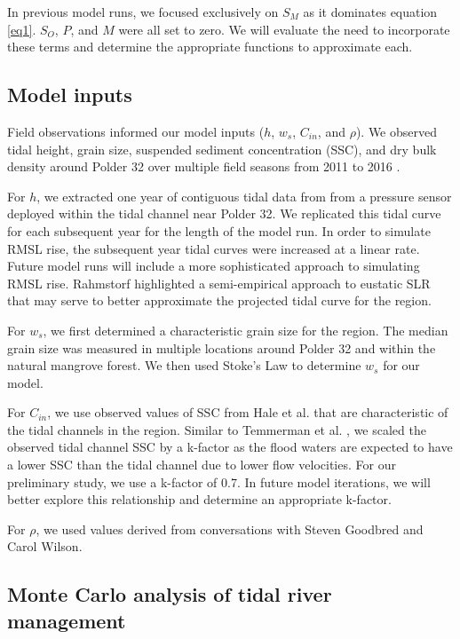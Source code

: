 \documentclass{wscpaperproc}
\theoremstyle{wsc}
\begin{document}
In previous model runs, we focused exclusively on $S_M$ as it dominates equation \ref{eq1}. $S_O$, $P$, and $M$ were all set to zero. We will evaluate the need to incorporate these terms and determine the appropriate functions to approximate each.

\subsection*{Model inputs}

Field observations informed our model inputs ($h$, $w_s$, $C_{in}$, and $\rho$). We observed tidal height, grain size, suspended sediment concentration (SSC), and dry bulk density around Polder 32 over multiple field seasons from 2011 to 2016 \cite{auerbachFloodRiskNatural2015,haleObservationsScalingTidal2019}.

For $h$, we extracted one year of contiguous tidal data from from a pressure sensor deployed within the tidal channel near Polder 32. We replicated this tidal curve for each subsequent year for the length of the model run. In order to simulate RMSL rise, the subsequent year tidal curves were increased at a linear rate. Future model runs will include a more sophisticated approach to simulating RMSL rise. Rahmstorf \cite{rahmstorfSemiEmpiricalApproachProjecting2007} highlighted a semi-empirical approach to eustatic SLR that may serve to better approximate the projected tidal curve for the region.

For $w_s$, we first determined a characteristic grain size for the region. The median grain size was measured in multiple locations around Polder 32 and within the natural mangrove forest. We then used Stoke's Law to determine $w_s$ for our model.

For $C_{in}$, we use observed values of SSC from Hale et al. \cite{haleObservationsScalingTidal2019} that are characteristic of the tidal channels in the region. Similar to Temmerman et al. \cite{temmermanModellingLongtermTidal2003,temmermanModellingEstuarineVariations2004}, we scaled the observed tidal channel SSC by a k-factor as the flood waters are expected to have a lower SSC than the tidal channel due to lower flow velocities. For our preliminary study, we use a k-factor of 0.7. In future model iterations, we will better explore this relationship and determine an appropriate k-factor.

For $\rho$, we used values derived from conversations with Steven Goodbred and Carol Wilson.

\subsection*{Monte Carlo analysis of tidal river management}
\end{document}

